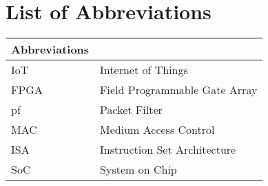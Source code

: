 


\clearpage
\pagestyle{headings}

\chapter[List of Abbreviations ]{List of Abbreviations}


\begin{center}
	\small
	\begin{longtable}{ll}
	\toprule
	Abbreviations & {} \\
	\bottomrule
	
	IoT				& Internet of Things \\
	FPGA				& Field Programmable Gate Array \\
	pf				& Packet Filter \\
	MAC				& Medium Access Control \\
	ISA				& Instruction Set Architecture \\
	SoC				& System on Chip \\
	\hline
	\end{longtable}
\end{center}

\clearpage

\tableofcontents
	\clearpage
\listoffigures
\listoftables


